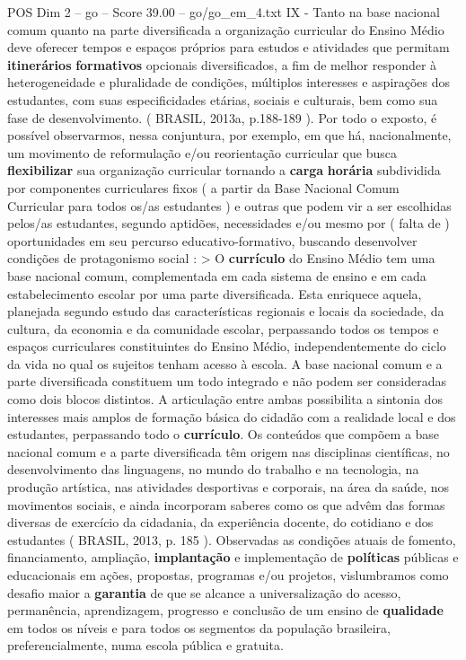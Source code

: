 \begin{textsample}{POS Dim 2 – go – Score 39.00 – go/go\_em\_4.txt}
IX - Tanto na base nacional comum quanto na parte diversificada a organização curricular do Ensino Médio deve oferecer tempos e espaços próprios para estudos e atividades que permitam \textbf{itinerários} \textbf{formativos} opcionais diversificados, a fim de melhor responder à heterogeneidade e pluralidade de condições, múltiplos interesses e aspirações dos estudantes, com suas especificidades etárias, sociais e culturais, bem como sua fase de desenvolvimento. ( BRASIL, 2013a, p.188-189 ).
Por todo o exposto, é possível observarmos, nessa conjuntura, por exemplo, em que há, nacionalmente, um movimento de reformulação e/ou reorientação curricular que busca \textbf{flexibilizar} sua organização curricular tornando a \textbf{carga} \textbf{horária} subdividida por componentes curriculares fixos ( a partir da Base Nacional Comum Curricular para todos os/as estudantes ) e outras que podem vir a ser escolhidas pelos/as estudantes, segundo aptidões, necessidades e/ou mesmo por ( falta de ) oportunidades em seu percurso educativo-formativo, buscando desenvolver condições de protagonismo social : > O \textbf{currículo} do Ensino Médio tem uma base nacional comum, complementada em cada sistema de ensino e em cada estabelecimento escolar por uma parte diversificada.
Esta enriquece aquela, planejada segundo estudo das características regionais e locais da sociedade, da cultura, da economia e da comunidade escolar, perpassando todos os tempos e espaços curriculares constituintes do Ensino Médio, independentemente do ciclo da vida no qual os sujeitos tenham acesso à escola.
A base nacional comum e a parte diversificada constituem um todo integrado e não podem ser consideradas como dois blocos distintos.
A articulação entre ambas possibilita a sintonia dos interesses mais amplos de formação básica do cidadão com a realidade local e dos estudantes, perpassando todo o \textbf{currículo}.
Os conteúdos que compõem a base nacional comum e a parte diversificada têm origem nas disciplinas científicas, no desenvolvimento das linguagens, no mundo do trabalho e na tecnologia, na produção artística, nas atividades desportivas e corporais, na área da saúde, nos movimentos sociais, e ainda incorporam saberes como os que advêm das formas diversas de exercício da cidadania, da experiência docente, do cotidiano e dos estudantes ( BRASIL, 2013, p. 185 ).
Observadas as condições atuais de fomento, financiamento, ampliação, \textbf{implantação} e implementação de \textbf{políticas} públicas e educacionais em ações, propostas, programas e/ou projetos, vislumbramos como desafio maior a \textbf{garantia} de que se alcance a universalização do acesso, permanência, aprendizagem, progresso e conclusão de um ensino de \textbf{qualidade} em todos os níveis e para todos os segmentos da população brasileira, preferencialmente, numa escola pública e gratuita.

\end{textsample}
